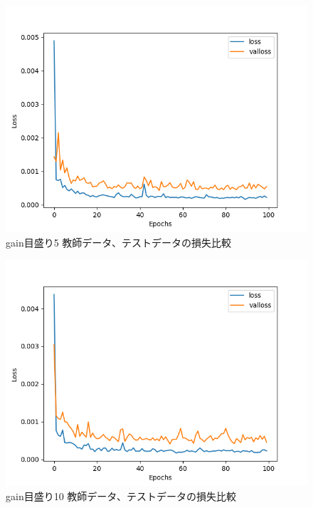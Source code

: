 \documentclass{jreport}		%
\begin{document}
\begin{figure}[htbp]
 \begin{center}
  \includegraphics[width=150mm]{gain5_loss_hikaku.png}
 \end{center}
 \caption{gain目盛り5 教師データ、テストデータの損失比較}
 \label{fig:one}
\end{figure}

\begin{figure}[htbp]
 \begin{center}
  \includegraphics[width=150mm]{gain10_loss_hikaku.png}
 \end{center}
 \caption{gain目盛り10 教師データ、テストデータの損失比較}
 \label{fig:one}
\end{figure}
\end{document}
